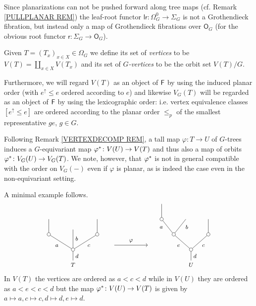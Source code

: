 \documentclass[a4paper,10pt]{article}%
\begin{document}
\begin{remark}\label{LRROOTMAP REM}
	Since planarizations can not be pushed forward along tree maps (cf. Remark \ref{PULLPLANAR REM})
the leaf-root functor $\mathsf{lr} \colon \Omega_{G}^0 \to \Sigma_G$ is not a Grothendieck fibration,
but instead only a map of Grothendieck fibrations over $\mathsf{O}_G$ 
(for the obvious root functor $\mathsf{r} \colon \Sigma_G \to \mathsf{O}_G$).
\end{remark}


\begin{definition}\label{VG DEF}
Given $T = (T_x)_{x \in X} \in \Omega_G$ we define its set of \textit{vertices} to be $V(T) = \coprod_{x \in X} V(T_x)$
and its set of
	\textit{$G$-vertices} to be the orbit set $V(T)/G$.
	
Furthermore, we will regard 
$V(T)$ as an object of $\mathsf{F}$ by using the induced planar order
(with $e^{\uparrow}\leq e$ ordered according to $e$)
and likewise $V_G(T)$ will be regarded as an object of $\mathsf{F}$ by using the lexicographic order: i.e. vertex equivalence classes 
$[e^{\uparrow} \leq e]$ are ordered according to the planar order $\leq_p$ of the smallest representative $ge$, $g \in G$.
\end{definition}


\begin{remark}\label{VERTEXDECOMPG REM}
	Following Remark \ref{VERTEXDECOMP REM},
	a tall map $\varphi \colon T \to U$ of $G$-trees
	induces a $G$-equivariant map
	$\varphi^{\**} \colon V(U) \to V(T)$
	and thus also a map of orbits
	$\varphi^{\**} \colon V_G(U) \to V_G(T)$.
	We note, however, that $\varphi^{\**}$ is not in general compatible with the order on $V_G(\minus)$ even if $\varphi$ is planar, as is indeed the case even in the non-equivariant setting.

A minimal example follows.
		\[
		\begin{tikzpicture}[grow=up,auto,level distance=2.2em,
		every node/.style = {font=\footnotesize},
		dummy/.style={circle,draw,inner sep=0pt,minimum size=1.75mm}]
		\node at (0,0) {$T$}
			child{node [dummy] {}
				child[sibling distance = 3.5em]{node [dummy] {}
					child
				edge from parent node[swap] {$c$}}
				child[level distance=2.9em]{
				edge from parent node [swap] {$b$}}
				child[sibling distance = 3.5em]{node [dummy] {}
					child
				edge from parent node {$a$}}		
			edge from parent node [swap] {$d$}};
		\node at (6,0) {$U$}
			child{node [dummy] {}
				child[sibling distance = 5em]{node [dummy] {}
					child
				edge from parent node [swap] {$c$}}
				child[sibling distance = 5em]{node [dummy] {}
					child[sibling distance = 3.5em]{
					edge from parent node [swap,near end] {$b$}}
					child[sibling distance = 3.5em]{node [dummy] {}
						child
					edge from parent node [near end]{$a$}}
				edge from parent node {$e$}}
			edge from parent node [swap] {$d$}};
		\draw[->] (2.1,1) -- node [above] {$\varphi$} (3.8,1) ;
		\end{tikzpicture}
		\]
In $V(T)$ the vertices are ordered as $a<c<d$ while in $V(U)$ they are ordered as $a<e<c<d$ but the map 
$\varphi^{\**} \colon V(U) \to V(T)$ is given by 
$a \mapsto a, c \mapsto c, d \mapsto d, e \mapsto d$.
\end{remark}
\end{document}
